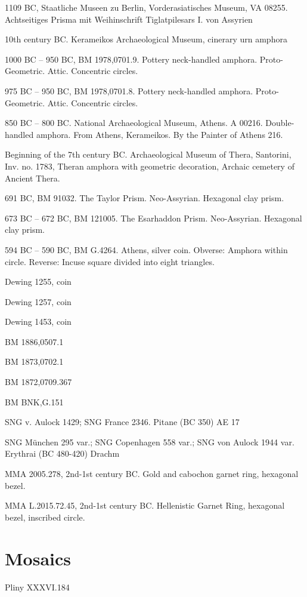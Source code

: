 \documentclass{article}
\begin{document}
1109 BC, Staatliche Museen zu Berlin, Vorderasiatisches Museum, VA 08255.
Achtseitiges Prisma mit Weihinschrift Tiglatpilesars I. von Assyrien

10th century BC. Kerameikos Archaeological Museum, cinerary urn amphora

1000 BC -- 950 BC, BM 1978,0701.9. Pottery neck-handled amphora.
Proto-Geometric. Attic. Concentric circles.

975 BC -- 950 BC, BM 1978,0701.8. Pottery neck-handled amphora. 
Proto-Geometric. Attic. Concentric circles.

850 BC -- 800 BC. National Archaeological Museum, Athens. A 00216. Double-handled amphora. From Athens, Kerameikos. By the Painter of Athens 216. 

Beginning of the 7th century BC. Archaeological Museum of Thera, Santorini, Inv. no. 1783, Theran amphora with geometric decoration,
Archaic cemetery of Ancient Thera.

691 BC, BM 91032. The Taylor Prism. Neo-Assyrian. Hexagonal clay prism.

673 BC -- 672 BC, BM 121005. The Esarhaddon Prism. Neo-Assyrian. Hexagonal clay prism.

594 BC -- 590 BC, BM G.4264. Athens, silver coin. Obverse: Amphora within circle. Reverse: Incuse square divided into eight triangles.

Dewing 1255, coin

Dewing 1257, coin

Dewing 1453, coin

BM 1886,0507.1

BM 1873,0702.1

BM 1872,0709.367

BM BNK,G.151

SNG v. Aulock 1429; SNG France 2346. Pitane (BC 350) AE 17

SNG M\"unchen 295 var.; SNG Copenhagen 558 var.; SNG von Aulock 1944 var. Erythrai (BC 480-420) Drachm

MMA 2005.278, 2nd-1st century BC. Gold and cabochon garnet ring, hexagonal bezel.

MMA L.2015.72.45, 2nd-1st century BC. Hellenistic Garnet Ring, hexagonal bezel, inscribed
circle.




\section{Mosaics}
Pliny XXXVI.184 \cite{LCL419}
\end{document}
